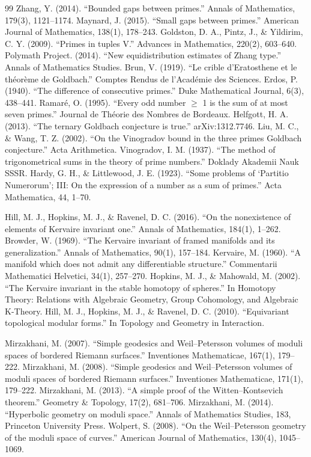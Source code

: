 \begin{thebibliography}{99}
 Zhang, Y. (2014). ``Bounded gaps between primes.'' Annals of Mathematics, 179(3), 1121--1174.
 Maynard, J. (2015). ``Small gaps between primes.'' American Journal of Mathematics, 138(1), 178--243.
 Goldston, D. A., Pintz, J., \& Yildirim, C. Y. (2009). ``Primes in tuples V.'' Advances in Mathematics, 220(2), 603--640.
 Polymath Project. (2014). ``New equidistribution estimates of Zhang type.'' Annals of Mathematics Studies.
 Brun, V. (1919). ``Le crible d'Eratosthene et le théorème de Goldbach.'' Comptes Rendus de l'Académie des Sciences.
 Erdos, P. (1940). ``The difference of consecutive primes.'' Duke Mathematical Journal, 6(3), 438--441.
 Ramaré, O. (1995). ``Every odd number $\geq$ 1 is the sum of at most seven primes.'' Journal de Théorie des Nombres de Bordeaux.
 Helfgott, H. A. (2013). ``The ternary Goldbach conjecture is true.'' arXiv:1312.7746.
 Liu, M. C., \& Wang, T. Z. (2002). ``On the Vinogradov bound in the three primes Goldbach conjecture.'' Acta Arithmetica.
 Vinogradov, I. M. (1937). ``The method of trigonometrical sums in the theory of prime numbers.'' Doklady Akademii Nauk SSSR.
 Hardy, G. H., \& Littlewood, J. E. (1923). ``Some problems of `Partitio Numerorum'; III: On the expression of a number as a sum of primes.'' Acta Mathematica, 44, 1--70.

 Hill, M. J., Hopkins, M. J., \& Ravenel, D. C. (2016). ``On the nonexistence of elements of Kervaire invariant one.'' Annals of Mathematics, 184(1), 1--262.
 Browder, W. (1969). ``The Kervaire invariant of framed manifolds and its generalization.'' Annals of Mathematics, 90(1), 157--184.
 Kervaire, M. (1960). ``A manifold which does not admit any differentiable structure.'' Commentarii Mathematici Helvetici, 34(1), 257--270.
 Hopkins, M. J., \& Mahowald, M. (2002). ``The Kervaire invariant in the stable homotopy of spheres.'' In Homotopy Theory: Relations with Algebraic Geometry, Group Cohomology, and Algebraic K-Theory.
 Hill, M. J., Hopkins, M. J., \& Ravenel, D. C. (2010). ``Equivariant topological modular forms.'' In Topology and Geometry in Interaction.

 Mirzakhani, M. (2007). ``Simple geodesics and Weil--Petersson volumes of moduli spaces of bordered Riemann surfaces.'' Inventiones Mathematicae, 167(1), 179--222.
 Mirzakhani, M. (2008). ``Simple geodesics and Weil--Petersson volumes of moduli spaces of bordered Riemann surfaces.'' Inventiones Mathematicae, 171(1), 179--222.
 Mirzakhani, M. (2013). ``A simple proof of the Witten--Kontsevich theorem.'' Geometry \& Topology, 17(2), 681--706.
 Mirzakhani, M. (2014). ``Hyperbolic geometry on moduli space.'' Annals of Mathematics Studies, 183, Princeton University Press.
 Wolpert, S. (2008). ``On the Weil--Petersson geometry of the moduli space of curves.'' American Journal of Mathematics, 130(4), 1045--1069.


\end{thebibliography}
